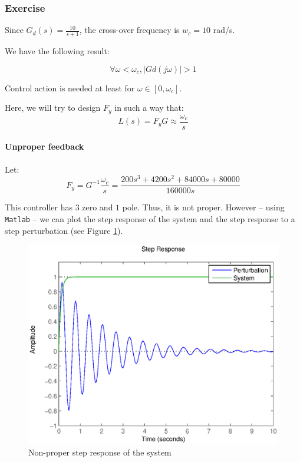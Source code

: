 \subsubsection{Exercise}

Since $G_d(s) = \frac{10}{s+1}$, the cross-over frequency is $w_c = 10$ rad/s.

We have the following result:

$$\forall \omega < \omega_c, |Gd(j\omega)| >1$$

Control action is needed at least for $\omega \in [0,\omega_c]$.

Here, we will try to design $F_y$ in such a way that:
$$L(s) = F_y G \approx \frac{\omega_c}{s}$$

\paragraph{Unproper feedback}
Let:
$$F_y = G^{-1} \frac{\omega_c}{s} = \frac{200 s^3 + 4200 s^2 + 84000 s + 80000}{160000 s}$$

This controller has $3$ zero and $1$ pole. Thus, it is not proper. However -- using \texttt{Matlab} -- we can plot the step response of the system and the step response to a step perturbation (see Figure \ref{stepNonProper}).

\begin{figure}[h!t]
    \centering
    \includegraphics[width=\linewidth]{fig/stepNonProper421.eps}
    \caption{Non-proper step response of the system}
    \label{stepNonProper}
\end{figure}

